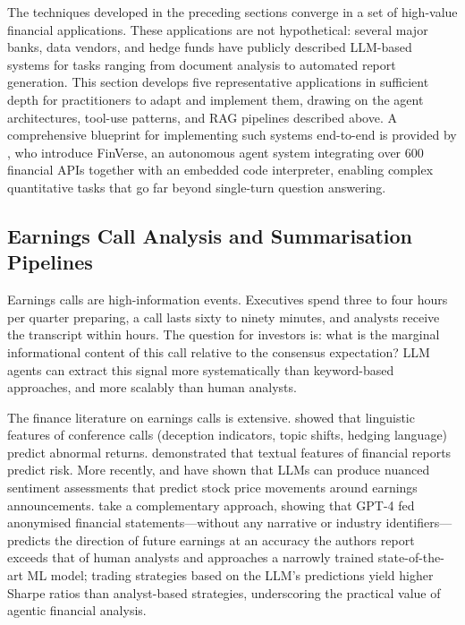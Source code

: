 \begin{context}
The techniques developed in the preceding sections converge in a set of high-value
financial applications. These applications are not hypothetical: several major banks, data
vendors, and hedge funds have publicly described LLM-based systems
for tasks ranging from document analysis to automated report generation. This section
develops five representative applications in sufficient depth for practitioners to
adapt and implement them, drawing on the agent architectures, tool-use patterns,
and RAG pipelines described above. A comprehensive blueprint for implementing such
systems end-to-end is provided by \citet{an2024finverse}, who introduce FinVerse, an
autonomous agent system integrating over 600 financial APIs together with an embedded
code interpreter, enabling complex quantitative tasks that go far beyond single-turn
question answering.


\subsection{Earnings Call Analysis and Summarisation Pipelines}
\label{subsec:earnings-analysis}

Earnings calls are high-information events. Executives spend three to four hours per
quarter preparing, a call lasts sixty to ninety minutes, and analysts receive the
transcript within hours. The question for investors is: what is the marginal
informational content of this call relative to the consensus expectation? LLM agents
can extract this signal more systematically than keyword-based approaches, and more
scalably than human analysts.

The finance literature on earnings calls is extensive. \citet{larcker2012detecting}
showed that linguistic features of conference calls (deception indicators, topic shifts,
hedging language) predict abnormal returns. \citet{kogan2009predicting} demonstrated
that textual features of financial reports predict risk. More recently, \citet{ko2024can}
and \citet{LopezLiraTang2023} have shown that LLMs can produce nuanced sentiment
assessments that predict stock price movements around earnings announcements.
\citet{kim2024financial} take a complementary approach, showing that GPT-4
fed anonymised financial statements---without any narrative or industry identifiers---
predicts the direction of future earnings at an accuracy the authors report exceeds that
of human analysts and approaches a narrowly trained state-of-the-art ML model; trading
strategies based on the LLM's predictions yield higher Sharpe ratios than analyst-based
strategies, underscoring the practical value of agentic financial analysis.


\end{context}
